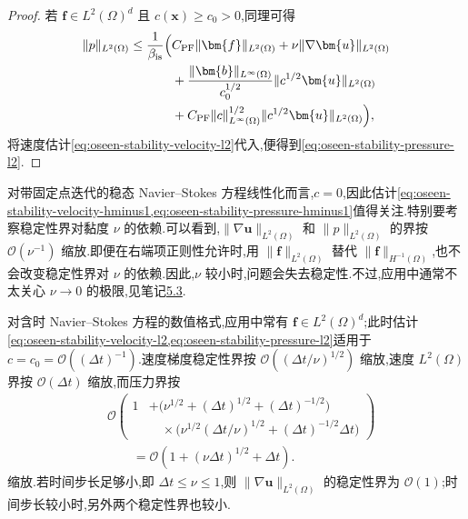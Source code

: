 \begin{proof}
若 $\bm{f}\in L^2(\Omega)^d$ 且 $c(\bm{x})\ge c_0>0$,同理可得
\[
\begin{aligned}
  \|p\|_{L^2(\Omega)}\le\frac{1}{\beta_{\mathrm{is}}}\Bigl(&
      C_{\mathrm{PF}}\|\bm{f}\|_{L^2(\Omega)}
      +\nu\|\nabla\bm{u}\|_{L^2(\Omega)}\\
    &+\frac{\|\bm{b}\|_{L^\infty(\Omega)}}{c_0^{1/2}}
       \|c^{1/2}\bm{u}\|_{L^2(\Omega)}\\
    &+C_{\mathrm{PF}}\|c\|_{L^\infty(\Omega)}^{1/2}
       \|c^{1/2}\bm{u}\|_{L^2(\Omega)}\Bigr),
\end{aligned}
\]
将速度估计\cref{eq:oseen-stability-velocity-l2}代入,便得到\cref{eq:oseen-stability-pressure-l2}.
\end{proof}

\begin{note}[稳定性估计的讨论]\label{note:oseen-stability-discussion}
对带固定点迭代的稳态 Navier--Stokes 方程线性化而言,$c=0$,因此估计\cref{eq:oseen-stability-velocity-hminus1,eq:oseen-stability-pressure-hminus1}值得关注.特别要考察稳定性界对黏度 $\nu$ 的依赖.可以看到,$\|\nabla\bm{u}\|_{L^2(\Omega)}$ 和 $\|p\|_{L^2(\Omega)}$ 的界按 $\mathcal{O}(\nu^{-1})$ 缩放.即便在右端项正则性允许时,用 $\|\bm{f}\|_{L^2(\Omega)}$ 替代 $\|\bm{f}\|_{H^{-1}(\Omega)}$,也不会改变稳定性界对 $\nu$ 的依赖.因此,$\nu$ 较小时,问题会失去稳定性.不过,应用中通常不太关心 $\nu\to0$ 的极限,见笔记\hyperref[note:oseen-coefficients]{5.3}.

对含时 Navier--Stokes 方程的数值格式,应用中常有 $\bm{f}\in L^2(\Omega)^d$;此时估计\cref{eq:oseen-stability-velocity-l2,eq:oseen-stability-pressure-l2}适用于 $c=c_0=\mathcal{O}((\Delta t)^{-1})$.速度梯度稳定性界按 $\mathcal{O}((\Delta t/\nu)^{1/2})$ 缩放,速度 $L^2(\Omega)$ 界按 $\mathcal{O}(\Delta t)$ 缩放,而压力界按
\[
\begin{aligned}
  &\mathcal{O}\!\left(
     \begin{aligned}
       1&+\bigl(\nu^{1/2}+(\Delta t)^{1/2}+(\Delta t)^{-1/2}\bigr)\\
        &\quad\times\bigl(\nu^{1/2}(\Delta t/\nu)^{1/2}
             +(\Delta t)^{-1/2}\Delta t\bigr)
     \end{aligned}
   \right)\\
  &\qquad=\mathcal{O}\!\left(1+(\nu\Delta t)^{1/2}+\Delta t\right).
\end{aligned}
\]
缩放.若时间步长足够小,即 $\Delta t\le\nu\le1$,则 $\|\nabla\bm{u}\|_{L^2(\Omega)}$ 的稳定性界为 $\mathcal{O}(1)$;时间步长较小时,另外两个稳定性界也较小.
\end{note}


